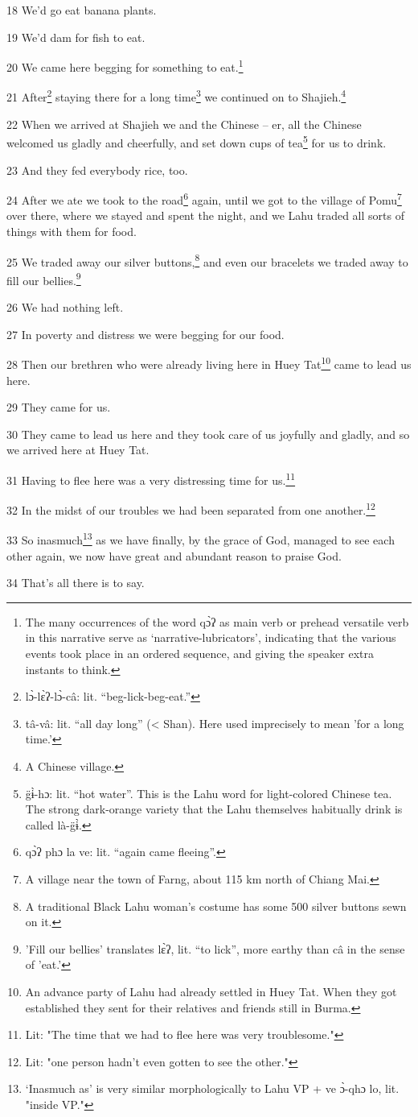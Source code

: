 18 We'd go eat banana plants.

19 We'd dam for fish to eat.

20 We came here begging for something to eat.\footnote{The many occurrences of the word qɔ̀ʔ as main verb or prehead versatile verb in this narrative serve as `narrative-lubricators', indicating that the various events took place in an ordered sequence, and giving the speaker extra instants to think.}

21 After\footnote{lɔ̀-lɛ̀ʔ-lɔ̀-câ: lit. ``beg-lick-beg-eat.''} staying there for a long time\footnote{tâ-vâ: lit. ``all day long'' (< Shan). Here used imprecisely to mean 'for a long time.'} we continued on to Shajieh.\footnote{A Chinese village.}

22 When we arrived at Shajieh we and the Chinese -- er, all the Chinese welcomed
us gladly and cheerfully, and set down cups of tea\footnote{g̈ɨ̀-hɔ: lit. ``hot water''. This is the Lahu word for light-colored Chinese tea. The strong dark-orange variety that the Lahu themselves habitually drink is called là-g̈ɨ̀.} for us to drink.

23 And they fed everybody rice, too.

24 After we ate we took to the road\footnote{qɔ̀ʔ phɔ la ve: lit. ``again came fleeing''.} again, until we got to the village of Pomu\footnote{A village near the town of Farng, about 115 km north of Chiang Mai.}
over there, where we stayed and spent the night, and we Lahu traded all sorts of
things with them for food.

25 We traded away our silver buttons,\footnote{A traditional Black Lahu woman's costume has some 500 silver buttons sewn on it.} and even our bracelets we traded away
to fill our bellies.\footnote{'Fill our bellies' translates lɛ̀ʔ, lit. ``to lick'', more earthy than câ in the sense of 'eat.'}

26 We had nothing left.

27 In poverty and distress we were begging for our food.

28 Then our brethren who were already living here in Huey Tat\footnote{An advance party of Lahu had already settled in Huey Tat. When they got established they sent for their relatives and friends still in Burma.} came to lead
us here.

29 They came for us.

30 They came to lead us here and they took care of us joyfully and gladly, and
so we arrived here at Huey Tat.

31 Having to flee here was a very distressing time for us.\footnote{Lit: "The time that we had to flee here was very troublesome."}

32 In the midst of our troubles we had been separated from one another.\footnote{Lit: "one person hadn't even gotten to see the other."}

33 So inasmuch\footnote{`Inasmuch as' is very similar morphologically to Lahu VP + ve ɔ̀-qhɔ lo, lit. "inside VP."} as we have finally, by the grace of God, managed to see each
other again, we now have great and abundant reason to praise God.

34 That's all there is to say.

